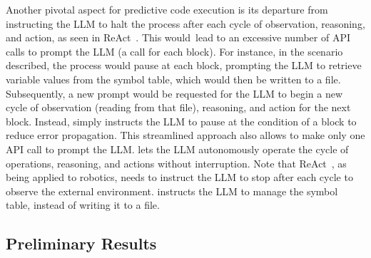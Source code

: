 Another pivotal aspect for predictive code
execution is its departure from instructing the LLM
to halt the process after each cycle of observation, reasoning, and
action, as seen in ReAct~\cite{yao2023react}. This would~lead
to an excessive number of API calls to prompt the LLM (a call for each
block). For instance, in the scenario described, the process would
pause at each block, prompting the LLM to retrieve variable values
from the symbol table, which would then be written to a
file. Subsequently, a new prompt would be requested for the LLM to
begin a new cycle of observation (reading from that file),
reasoning, and action for the next block. Instead, {\orca}
simply instructs the LLM to pause at the condition of a block to
reduce error propagation. This streamlined approach also allows
{\orca} to make only one API call to prompt the LLM. {\orca} lets the LLM autonomously operate the cycle of operations,
reasoning, and actions without interruption. Note that
ReAct~\cite{yao2023react}, as being applied to robotics, needs
to instruct the LLM to stop after each cycle to observe the external
environment. {\orca} instructs the LLM to manage the symbol table,
instead of writing it to a file.



\subsection{Preliminary Results}



